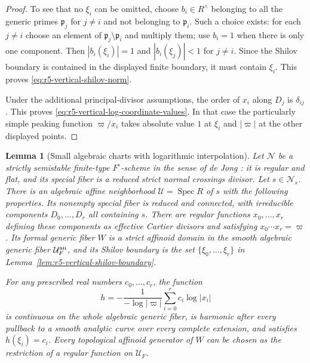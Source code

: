 \documentclass[11pt,a4paper]{article}
\numberwithin{equation}{section}
\newtheorem{lemma}[theorem]{Lemma}
\theoremstyle{definition}
\theoremstyle{remark}
\begin{document}
\begin{proof}
To see that no $\xi_i$ can be omitted, choose
$b_i\in R^\wedge$ belonging to all the generic primes
$\mathfrak p_j$ for $j\ne i$ and not belonging to
$\mathfrak p_i$.  Such a choice exists: for each $j\ne i$ choose
an element of $\mathfrak p_j\setminus\mathfrak p_i$ and multiply
them; use $b_i=1$ when there is only one component.  Then
$|b_i(\xi_i)|=1$ and $|b_i(\xi_j)|<1$ for $j\ne i$.
Since the Shilov boundary is contained in the displayed finite
boundary, it must contain $\xi_i$.  This proves
\eqref{eq:r5-vertical-shilov-norm}.

Under the additional principal-divisor assumptions, the order of
$x_i$ along $D_j$ is $\delta_{ij}$.  This proves
\eqref{eq:r5-vertical-log-coordinate-values}.  In that case the
particularly simple peaking function $\varpi/x_i$ takes absolute
value $1$ at $\xi_i$ and $|\varpi|$ at the other displayed points.
\end{proof}

\begin{lemma}[Small algebraic charts with logarithmic interpolation]
\label{lem:r5-local-vertical-interpolation}
Let $\mathcal N$ be a strictly semistable finite-type
$F^\circ$-scheme in the sense of de Jong
\cite[\S2.16]{dJ96}: it is regular and flat, and its special
fiber is a reduced strict normal crossings divisor.  Let
$s\in\mathcal N_s$.  There is an
algebraic affine neighborhood $\mathcal U=\operatorname{Spec}R$
of $s$ with the following properties.  Its nonempty special fiber
is reduced and connected, with irreducible components
$D_0,\ldots,D_r$ all containing $s$.  There are regular functions
$x_0,\ldots,x_r$ defining these components as effective Cartier
divisors and satisfying $x_0\cdots x_r=\varpi$.  Its formal
generic fiber $W$ is a strict affinoid domain in the smooth
algebraic generic fiber $\mathcal U_F^{\rm an}$, and its Shilov
boundary is the set $\{\xi_0,\ldots,\xi_r\}$ in
Lemma~\ref{lem:r5-vertical-shilov-boundary}.

For any prescribed real numbers $c_0,\ldots,c_r$, the function
\begin{equation}
 h=-\frac{1}{-\log|\varpi|}
       \sum_{i=0}^r c_i\log|x_i|
 \label{eq:r5-vertical-log-interpolant}
\end{equation}
is continuous on the whole algebraic generic fiber, is harmonic
after every pullback to a smooth analytic curve over every complete
extension, and satisfies $h(\xi_i)=c_i$.  Every topological
affinoid generator of $W$ can be chosen as the restriction of a
regular function on $\mathcal U_F$.
\end{lemma}
\end{document}

